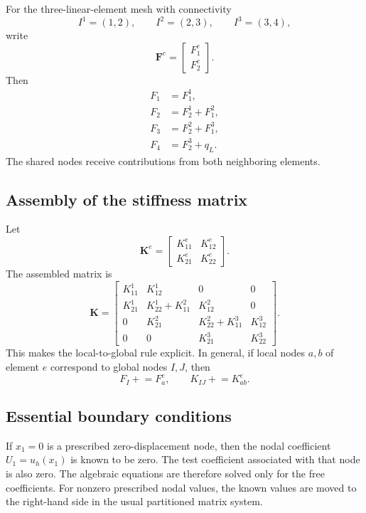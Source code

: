 \documentclass[11pt]{article}
\newcommand{\bK}{\mathbf{K}}
\newcommand{\bKe}{\mathbf{K}^{e}}
\newcommand{\bFe}{\mathbf{F}^{e}}
\begin{document}
For the three-linear-element mesh with connectivity
\[
I^1=(1,2),\qquad I^2=(2,3),\qquad I^3=(3,4),
\]
write
\[
\bFe=
\begin{bmatrix}F_1^e\\F_2^e\end{bmatrix}.
\]
Then
\begin{align*}
F_1&=F_1^1,\\
F_2&=F_2^1+F_1^2,\\
F_3&=F_2^2+F_1^3,\\
F_4&=F_2^3+q_L.
\end{align*}
The shared nodes receive contributions from both neighboring elements.

\subsection{Assembly of the stiffness matrix}

Let
\[
\bKe=
\begin{bmatrix}
K_{11}^e&K_{12}^e\\
K_{21}^e&K_{22}^e
\end{bmatrix}.
\]
The assembled matrix is
\begin{equation}
\bK=
\begin{bmatrix}
K_{11}^1 & K_{12}^1 & 0 & 0\\
K_{21}^1 & K_{22}^1+K_{11}^2 & K_{12}^2 & 0\\
0 & K_{21}^2 & K_{22}^2+K_{11}^3 & K_{12}^3\\
0 & 0 & K_{21}^3 & K_{22}^3
\end{bmatrix}.
\label{eq:assembled-general}
\end{equation}
This makes the local-to-global rule explicit. In general, if local nodes
$a,b$ of element $e$ correspond to global nodes $I,J$, then
\begin{equation}
\boxed{
F_I\mathrel{+}=F_a^e,
\qquad
K_{IJ}\mathrel{+}=K_{ab}^e.}
\label{eq:assembly-rule}
\end{equation}

\subsection{Essential boundary conditions}

If $x_1=0$ is a prescribed zero-displacement node, then the nodal coefficient
$U_1=u_h(x_1)$ is known to be zero. The test coefficient associated with that
node is also zero. The algebraic equations are therefore solved only for the
free coefficients. For nonzero prescribed nodal values, the known values are
moved to the right-hand side in the usual partitioned matrix system.
\end{document}
